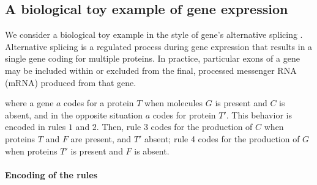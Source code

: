 \subsection{A  biological toy example of gene expression}\label{subsec:toy}

\noindent
We consider a biological toy  example in the style of gene's alternative splicing \cite{WBB13}.
Alternative splicing is a regulated process during gene expression that results in a single gene 
coding for multiple proteins. 
In practice, particular exons of a gene may be included within or excluded from the final, 
processed messenger RNA (mRNA) produced from that gene.
 
where a gene $a$  codes for a protein $T$ when molecules 
$G$ is present and $C$ is absent, and in the opposite situation $a$ codes for protein $T'$.
This behavior is encoded in rules $1$ and $2$.
Then, rule 3 codes for the production of $C$ when proteins $T$ and $F$ are present, and $T'$ absent;
rule 4 codes for the production of $G$ when  proteins $T'$ is present and $F$ is absent.

\paragraph{Encoding of the rules}

